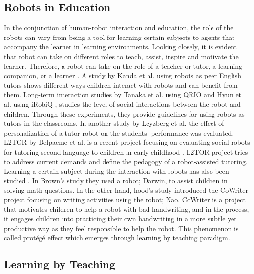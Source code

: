 \documentclass{sigchi}
\begin{document}
\subsection{Robots in Education}
In the conjunction of human-robot interaction and education, the role of the robots can vary from being a tool for learning certain subjects to agents that accompany the learner in learning environments. 
Looking closely, it is evident that robot can take on different roles to teach, assist, inspire and motivate the learner. 
Therefore, a robot can take on the role of a teacher or tutor, a learning companion, or a learner \cite{mubin2013review,leite2013social,hood2015children}. 
A study by Kanda et al. \cite{kanda2004interactive} using robots as peer English tutors shows different ways children interact with robots and can benefit from them. 
Long-term interaction studies by Tanaka et al. using QRIO \cite{tanaka2007socialization} and Hyun et al. using iRobiQ \cite{hyun2010relationships}, studies the level of social interactions between the robot and children. 
Through these experiments, they provide guidelines for using robots as tutors in the classrooms.
In another study by Leyzberg et al. \cite{leyzberg2014personalizing} the effect of personalization of a tutor robot on the students' performance was evaluated. 
L2TOR by Belpaeme et al. \cite{belpaeme2015l2tor} is a recent project focusing on evaluating social robots for tutoring second language to children in early childhood .
L2TOR project tries to address current demands and define the pedagogy of a robot-assisted tutoring. 
Learning a certain subject during the interaction with robots has also been studied \cite{brown2013engaging,hood2015children}. 
In Brown's study \cite{brown2013engaging} they used a robot; Darwin, to assist children in solving math questions.
In the other hand, hood's study \cite{hood2015children, lemaignan2016learning} introduced the CoWriter project focusing on writing activities using the robot; Nao.
CoWriter is a project that motivates children to help a robot with bad handwriting, and in the process, it engages children into practicing their own handwriting in a more subtle yet productive way as they feel responsible to help the robot. 
This phenomenon is called protégé effect which emerges through learning by teaching paradigm.  

\subsection{Learning by Teaching}
\end{document}
